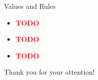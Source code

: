 \documentclass[]{beamer}
\newcommand{\TODO}{\textbf{\textcolor{red}{TODO}}} %
\begin{document}

    \begin{frame}{Values and Rules}
      \begin{itemize}
        \item \TODO
        \item \TODO
        \item \TODO
      \end{itemize}
    \end{frame}


\begin{frame}[plain]
  \vspace{20mm}
  \centerline{Thank you for your attention!}
\end{frame}
\end{document}
